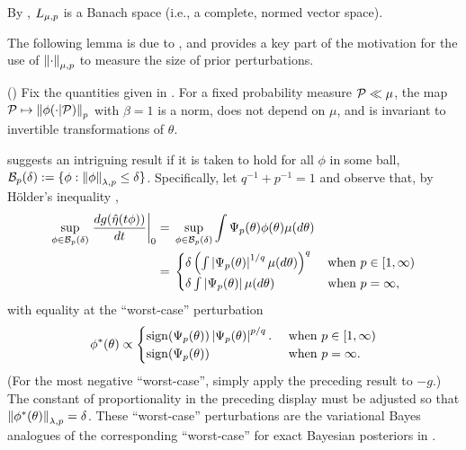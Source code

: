 By \citep[Theorem 5.2.1]{dudley:2018:real}, ${L_{\mu,p}}$ is a Banach
space (i.e., a complete, normed vector space).

The following lemma is due to \citep{gustafson:1996:local}, and provides
a key part of the motivation for the use of $\left\Vert\cdot\right\Vert_{\mu,p}$ to measure
the size of prior perturbations.

\begin{lem}
%
(\citet{gustafson:1996:local})
%
Fix the quantities given in .  For a fixed probability
measure $\mathcal{P} \ll \mu$, the map $\mathcal{P} \mapsto \left\Vert\phi(\cdot \vert \mathcal{P})\right\Vert_p$ with
$\beta = 1$ is a norm, does not depend on $\mu$, and is invariant to invertible
transformations of $\theta$.
%
%
\end{lem}

 suggests an intriguing result if it is taken to hold
for all $\phi$ in some ball, $\mathcal{B}_p(\delta) := \{\phi: \left\Vert\phi\right\Vert_{\lambda,p}
\le \delta \}$. Specifically, let $q^{-1} + p^{-1} = 1$ and observe that, by
H{\"o}lder's inequality \citep[Theorem 5.1.2 and subsequent
disscussion]{dudley:2018:real},
%
\begin{align*}
%
\sup_{\phi \in \ball_p(\delta)} \fracat{d g(\etaopt(\t \phi))}{d \t}{0} ={}&
    \sup_{\phi \in \ball_p(\delta)}
        \int \infl_p(\theta) \phi(\theta) \mu(d\theta)
\\={}&
\begin{cases}
\delta \left( \int \abs{\infl_p(\theta)}^{1/q} \mu(d\theta) \right)^q
    & \textrm{ when }p \in [1, \infty)\\
\delta \int \abs{\infl_p(\theta)} \mu(d\theta)
    & \textrm{ when }p = \infty,
\end{cases}
%
\end{align*}
%
with equality at the ``worst-case'' perturbation
%
\begin{align*}
%
\phi^*(\theta) \propto
\begin{cases}
\mathrm{sign}(\infl_p(\theta)) \abs{\infl_p(\theta)}^{p/q}.
& \textrm{ when }p \in [1, \infty)\\
\mathrm{sign}(\infl_p(\theta))
& \textrm{ when }p = \infty.
\end{cases}
%
\end{align*}
%
(For the most negative ``worst-case'', simply apply the preceding result to
$-g$.) The constant of proportionality in the preceding display must be adjusted
so that $\left\Vert\phi^*(\theta)\right\Vert_{\lambda,p} = \delta$.  These ``worst-case''
perturbations are the variational Bayes analogues of the corresponding
``worst-case'' for exact Bayesian posteriors in \citet{gustafson:1996:local}.

